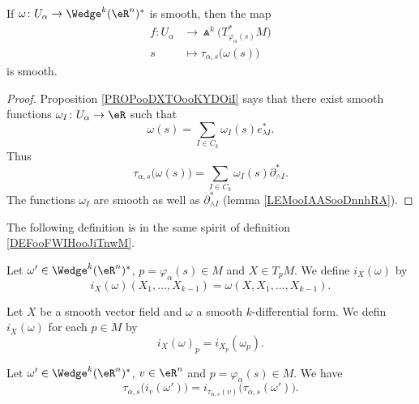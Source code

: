 \begin{proposition}		\label{PROPooFWEQooIqTFSa}
	If \(\omega \colon U_{\alpha}\to \Wedge^k(\eR^n)^*  \) is smooth, then the map
	\begin{equation}
		\begin{aligned}
			f\colon U_{\alpha} & \to \Wedge^k\big( T^*_{\varphi_{\alpha}(s)}M \big) \\
			s                  & \mapsto \tau_{\alpha,s}\big( \omega(s) \big)
		\end{aligned}
	\end{equation}
	is smooth.
\end{proposition}

\begin{proof}
	Proposition \ref{PROPooDXTOooKYDOiI} says that there exist smooth functions \(\omega_I \colon U_{\alpha}\to \eR  \) such that
	\begin{equation}
		\omega(s)=\sum_{I\in C_k}\omega_I(s)e^*_{\lambda I}.
	\end{equation}
	Thus
	\begin{equation}
		\tau_{\alpha,s}\big( \omega(s) \big)=\sum_{I\in C_k}\omega_I(s)\partial^*_{\wedge I}.
	\end{equation}
	The functions \( \omega_I\) are smooth as well as \( \partial_{\wedge I}^*\) (lemma \ref{LEMooIAASooDnnhRA}).
\end{proof}

The following definition is in the same spirit of definition \ref{DEFooFWIHooJiTnwM}.
\begin{definition}		\label{DEFooZMQNooRNhWXk}
	Let \( \omega'\in \Wedge^k(\eR^n)^*\), \( p=\varphi_{\alpha}(s)\in M\) and \( X\in T_pM\). We define \( i_X(\omega)\) by
	\begin{equation}
		i_X(\omega)(X_1,\ldots,X_{k-1})=\omega(X,X_1,\ldots,X_{k-1}).
	\end{equation}

	Let \( X\) be a smooth vector field and \( \omega\) a smooth \( k\)-differential form. We defin \( i_X(\omega)\) for each \( p\in M\) by
	\begin{equation}
		i_X(\omega)_p=i_{X_p}(\omega_p).
	\end{equation}
\end{definition}

\begin{proposition}		\label{PROPooLCFAooLrbqeh}
	Let \( \omega'\in \Wedge^k(\eR^n)^*\), \( v\in \eR^n\) and \( p=\varphi_{\alpha}(s)\in M\). We have
	\begin{equation}
		\tau_{\alpha,s}\big( i_{v}(\omega') \big)=i_{\tau_{\alpha,s}(v)}\big( \tau_{\alpha,s}(\omega') \big).
	\end{equation}
\end{proposition}

